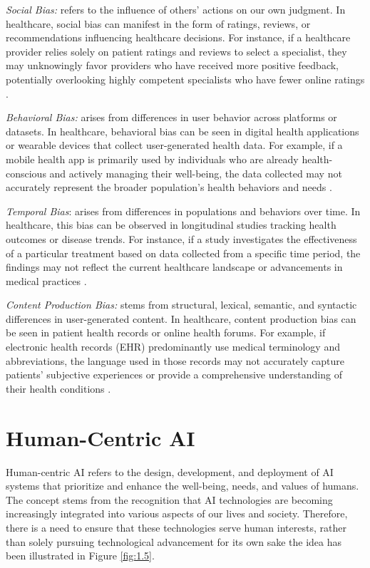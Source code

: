 \documentclass{article}
\begin{document}
\emph{Social Bias:} refers to the influence of others' actions on our own judgment. In healthcare, social bias can manifest in the form of ratings, reviews, or recommendations influencing healthcare decisions. For instance, if a healthcare provider relies solely on patient ratings and reviews to select a specialist, they may unknowingly favor providers who have received more positive feedback, potentially overlooking highly competent specialists who have fewer online ratings \cite{weber2019engineering, aquino2023making}.

\emph{Behavioral Bias:} arises from differences in user behavior across platforms or datasets. In healthcare, behavioral bias can be seen in digital health applications or wearable devices that collect user-generated health data. For example, if a mobile health app is primarily used by individuals who are already health-conscious and actively managing their well-being, the data collected may not accurately represent the broader population's health behaviors and needs \cite{olteanu2019social, ferrara2023should}.

\emph{Temporal Bias}: arises from differences in populations and behaviors over time. In healthcare, this bias can be observed in longitudinal studies tracking health outcomes or disease trends. For instance, if a study investigates the effectiveness of a particular treatment based on data collected from a specific time period, the findings may not reflect the current healthcare landscape or advancements in medical practices \cite{tufekci2014big}.

\emph{Content Production Bias:} stems from structural, lexical, semantic, and syntactic differences in user-generated content. In healthcare, content production bias can be seen in patient health records or online health forums. For example, if electronic health records (EHR) predominantly use medical terminology and abbreviations, the language used in those records may not accurately capture patients' subjective experiences or provide a comprehensive understanding of their health conditions \cite{drukker2023toward}.


\section{Human-Centric AI}
Human-centric AI refers to the design, development, and deployment of AI systems that prioritize and enhance the well-being, needs, and values of humans. The concept stems from the recognition that AI technologies are becoming increasingly integrated into various aspects of our lives and society. Therefore, there is a need to ensure that these technologies serve human interests, rather than solely pursuing technological advancement for its own sake the idea has been illustrated in Figure \ref{fig:1.5}.
\end{document}
